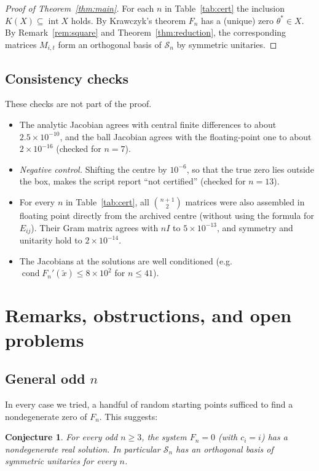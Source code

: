 \documentclass[11pt]{amsart}
\newtheorem{conjecture}[theorem]{Conjecture}
\theoremstyle{definition}
\theoremstyle{remark}
\newcommand{\Sym}{\mathcal{S}}
\begin{document}
\begin{proof}[Proof of Theorem~\ref{thm:main}]
For each $n$ in Table~\ref{tab:cert} the inclusion $K(X)\subseteq\operatorname{int}X$ holds. By Krawczyk's theorem $F_n$ has a (unique) zero $\theta^\ast\in X$. By Remark~\ref{rem:square} and Theorem~\ref{thm:reduction}, the corresponding matrices $M_{i,t}$ form an orthogonal basis of $\Sym_n$ by symmetric unitaries.
\end{proof}

\subsection{Consistency checks}
These checks are not part of the proof.
\begin{itemize}
\item The analytic Jacobian agrees with central finite differences to about $2.5\times10^{-10}$, and the ball Jacobian agrees with the floating-point one to about $2\times10^{-16}$ (checked for $n=7$).
\item \emph{Negative control.} Shifting the centre by $10^{-6}$, so that the true zero lies outside the box, makes the script report ``not certified'' (checked for $n=13$).
\item For every $n$ in Table~\ref{tab:cert}, all $\binom{n+1}{2}$ matrices were also assembled in floating point directly from the archived centre (without using the formula for $E_{ij}$). Their Gram matrix agrees with $nI$ to $5\times10^{-13}$, and symmetry and unitarity hold to $2\times10^{-14}$.
\item The Jacobians at the solutions are well conditioned (e.g.\ $\operatorname{cond}F_n'(\tilde x)\le 8\times10^{2}$ for $n\le41$).
\end{itemize}

\section{Remarks, obstructions, and open problems}\label{sec:remarks}

\subsection{General odd \texorpdfstring{$n$}{n}}
In every case we tried, a handful of random starting points sufficed to find a nondegenerate zero of $F_n$. This suggests:

\begin{conjecture}\label{conj:B}
For every odd $n\ge3$, the system $F_n=0$ (with $c_i=i$) has a nondegenerate real solution. In particular $\Sym_n$ has an orthogonal basis of symmetric unitaries for every $n$.
\end{conjecture}
\end{document}
